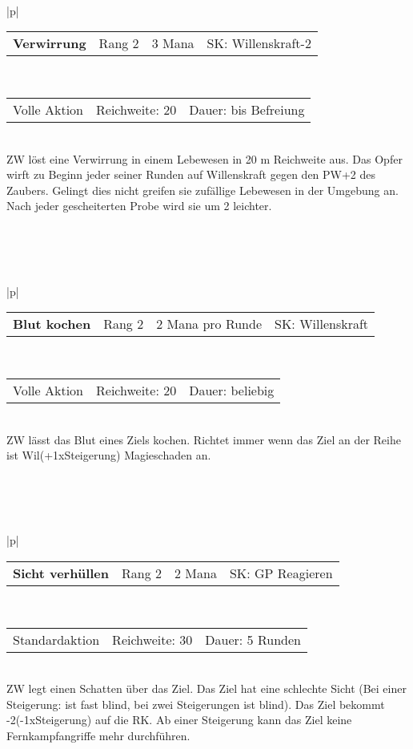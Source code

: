 \documentclass[../../Heldenanleitung2]{subfiles}
\begin{document}
\\\\\\
\begin{tabular}{|p{\textwidth}|}
\hline
\begin{tabularx}{\textwidth}{X|X|X|X}
\textbf{Verwirrung} & Rang 2 & 3 Mana & SK: Willenskraft-2
\end{tabularx} \\ \hline
\begin{tabularx}{\textwidth}{X|X|X}
Volle Aktion & Reichweite: 20 & Dauer: bis Befreiung
\end{tabularx} \\ \hline
ZW löst eine Verwirrung in einem Lebewesen in 20 m Reichweite aus. Das Opfer wirft zu Beginn jeder seiner Runden auf Willenskraft gegen den PW+2 des Zaubers. Gelingt dies nicht greifen sie zufällige Lebewesen in der Umgebung an. Nach jeder gescheiterten Probe wird sie um 2 leichter.
\\ \hline
\end{tabular}
\\\\\\
\begin{tabular}{|p{\textwidth}|}
\hline
\begin{tabularx}{\textwidth}{X|X|X|X}
\textbf{Blut kochen} & Rang 2 & 2 Mana pro Runde & SK: Willenskraft
\end{tabularx} \\ \hline
\begin{tabularx}{\textwidth}{X|X|X}
Volle Aktion & Reichweite: 20 & Dauer: beliebig
\end{tabularx} \\ \hline
ZW lässt das Blut eines Ziels kochen. Richtet immer wenn das Ziel an der Reihe ist Wil(+1xSteigerung) Magieschaden an.
\\ \hline
\end{tabular}
\\\\\\
\begin{tabular}{|p{\textwidth}|}
\hline
\begin{tabularx}{\textwidth}{X|X|X|X}
\textbf{Sicht verhüllen} & Rang 2 & 2 Mana & SK: GP Reagieren
\end{tabularx} \\ \hline
\begin{tabularx}{\textwidth}{X|X|X}
Standardaktion & Reichweite: 30 & Dauer: 5 Runden
\end{tabularx} \\ \hline
ZW legt einen Schatten über das Ziel. Das Ziel hat eine schlechte Sicht (Bei einer Steigerung: ist fast blind, bei zwei Steigerungen ist blind). Das Ziel bekommt -2(-1xSteigerung) auf die RK. Ab einer Steigerung kann das Ziel keine Fernkampfangriffe mehr durchführen.
\\ \hline
\end{tabular}
\end{document}
